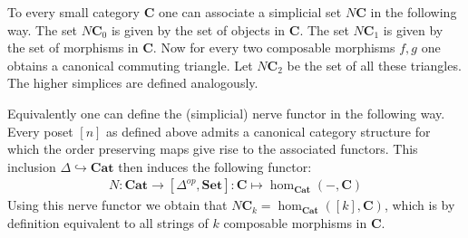 	\begin{construct}[Nerve]
		To every small category \textbf{C} one can associate a simplicial set $N\mathbf{C}$ in the following way. The set $N\mathbf{C}_0$ is given by the set of objects in $\mathbf{C}$. The set $N\mathbf{C}_1$ is given by the set of morphisms in $\mathbf{C}$. Now for every two composable morphisms $f, g$ one obtains a canonical commuting triangle. Let $N\mathbf{C}_2$ be the set of all these triangles. The higher simplices are defined analogously.
		
		Equivalently one can define the (simplicial) nerve functor in the following way. Every poset $[n]$ as defined above admits a canonical category structure for which the order preserving maps give rise to the associated functors. This inclusion $\Delta\hookrightarrow\mathbf{Cat}$ then induces the following functor:
		\begin{gather}
			N:\textbf{Cat}\rightarrow[\Delta^{op}, \textbf{Set}]:\mathbf{C}\mapsto\hom_{\mathbf{Cat}}(-, \mathbf{C})
		\end{gather}
		Using this nerve functor we obtain that $N\mathbf{C}_k=\hom_{\mathbf{Cat}}([k], \mathbf{C})$, which is by definition equivalent to all strings of $k$ composable morphisms in $\mathbf{C}$.
	\end{construct}
